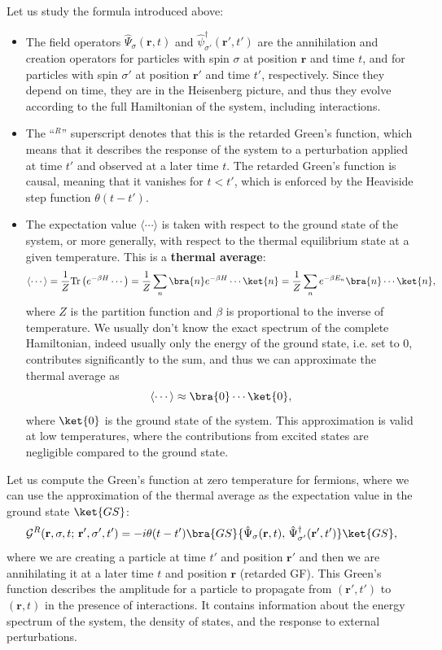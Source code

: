 Let us study the formula introduced above:
\begin{itemize}
    \item The field operators \(\hat{\Psi}_{\sigma} (\mathbf{r}, t)\) and \(\hat{\psi}_{\sigma'}^\dagger(\mathbf{r}', t')\) are the annihilation and creation operators for particles with spin \(\sigma\) at position \(\mathbf{r}\) and time \(t\), and for particles with spin \(\sigma'\) at position \(\mathbf{r}'\) and time \(t'\), respectively. Since they depend on time, they are in the Heisenberg picture, and thus they evolve according to the full Hamiltonian of the system, including interactions.
    \item The ``\(^R\)'' superscript denotes that this is the retarded Green's function, which means that it describes the response of the system to a perturbation applied at time \(t'\) and observed at a later time \(t\). The retarded Green's function is causal, meaning that it vanishes for \(t < t'\), which is enforced by the Heaviside step function \(\theta(t - t')\).
    \item The expectation value \(\langle \cdots \rangle\) is taken with respect to the ground state of the system, or more generally, with respect to the thermal equilibrium state at a given temperature. This is a \textbf{thermal average}:
          \[
              \langle \cdots \rangle = \frac{1}{Z} \mathrm{Tr} \left( e^{-\beta H} \cdots \right) = \frac{1}{Z} \sum_{n} \bra{n} e^{-\beta H} \cdots \ket{n} = \frac{1}{Z} \sum_{n} e^{- \beta E_n} \bra{n} \cdots \ket{n},
          \]
          where \(Z\) is the partition function and \(\beta\) is proportional to the inverse of temperature. We usually don't know the exact spectrum of the complete Hamiltonian, indeed usually only the energy of the ground state, i.e. set to 0, contributes significantly to the sum, and thus we can approximate the thermal average as
          \[
              \langle \cdots \rangle \approx \bra{0} \cdots \ket{0},
          \]
          where \(\ket{0}\) is the ground state of the system. This approximation is valid at low temperatures, where the contributions from excited states are negligible compared to the ground state.
\end{itemize}

Let us compute the Green's function at zero temperature for fermions, where we can use the approximation of the thermal average as the expectation value in the ground state \(\ket{GS}\):
\[
    \mathcal{G}^R(\mathbf{r}, \sigma, t;\,\mathbf{r}', \sigma', t') = -i \theta(t - t') \bra{GS} \{\hat{\Psi}_{\sigma} (\mathbf{r}, t),\, \hat{\Psi}_{\sigma'}^\dagger(\mathbf{r}', t') \} \ket{GS},
\]
where we are creating a particle at time \(t'\) and position \(\mathbf{r}'\) and then we are annihilating it at a later time \(t\) and position \(\mathbf{r}\) (retarded GF). This Green's function describes the amplitude for a particle to propagate from \((\mathbf{r}', t')\) to \((\mathbf{r}, t)\) in the presence of interactions. It contains information about the energy spectrum of the system, the density of states, and the response to external perturbations.

